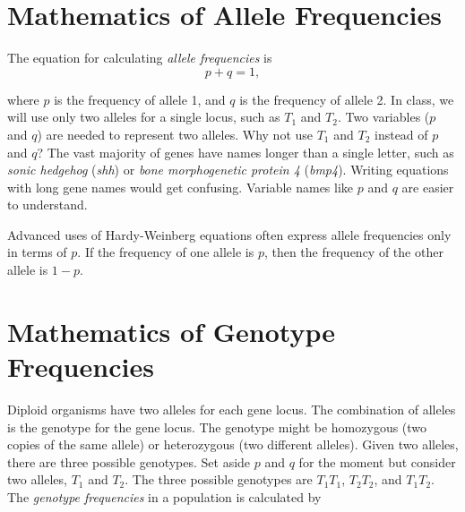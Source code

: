 \documentclass[letterpaper]{tufte-handout}
\begin{document}
\section*{Mathematics of Allele Frequencies}

The equation for calculating \emph{allele frequencies} is 
\begin{equation*}
p+q = 1,
\end{equation*}

where $p$ is the frequency of allele 1, and $q$ is the frequency of allele 2. In class, we will use only two alleles for a single locus, such as $T_1$ and $T_2$.  Two variables ($p$ and $q$) are needed to represent two alleles.  Why not use $T_1$ and $T_2$ instead of $p$ and $q$?  The vast majority of genes have names longer than a single letter, such as \emph{sonic hedgehog} (\emph{shh}) or \emph{bone morphogenetic protein 4} (\emph{bmp4}). Writing equations with long gene names would get confusing. Variable names like $p$ and $q$ are easier to understand.  

Advanced uses of Hardy-Weinberg equations often express allele frequencies only in terms of $p$. If the frequency of one allele is $p$, then the frequency of the other allele is $1-p.$

\section*{Mathematics of Genotype Frequencies}


Diploid organisms have two alleles for each gene locus. The combination of alleles is the genotype for the gene locus. The genotype might be homozygous (two copies of the same allele) or heterozygous (two different alleles).  Given two alleles, there are three possible genotypes. Set aside $p$ and $q$ for the moment but consider two alleles, $T_1$ and $T_2$. The three possible genotypes are $T_1T_1$, $T_2T_2$, and $T_1T_2$.  The \emph{genotype frequencies} in a population is calculated by
\end{document}
